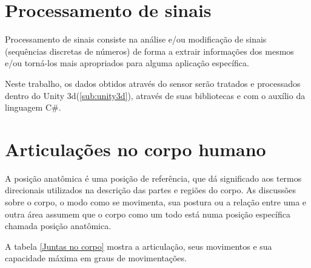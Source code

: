   \section{Processamento de sinais}
  \label{sec:processamentoSinais}
  Processamento de sinais consiste na análise e/ou modificação de sinais
(sequências discretas de números) de forma a extrair
informações dos mesmos e/ou torná-los mais apropriados para alguma aplicação específica.\cite{processamentoSinais}

    Neste trabalho, os dados obtidos através do sensor serão tratados e processados dentro do Unity 3d(\ref{sub:unity3d}), através de suas bibliotecas e com o auxílio da
   linguagem C\#.

   \section{Articulações no corpo humano}
   \label{sec:Juntas no corpo humano}
    A posição anatômica é uma posição de referência, que dá significado aos termos
    direcionais utilizados na descrição das partes e regiões do corpo. As discussões
    sobre o corpo, o modo como se movimenta, sua postura ou a relação entre uma e
   outra área assumem que o corpo como um todo está numa posição específica chamada
    posição anatômica.

     A tabela \ref{Juntas no corpo} mostra a articulação, seus movimentos e sua capacidade máxima em
   graus de movimentações.

